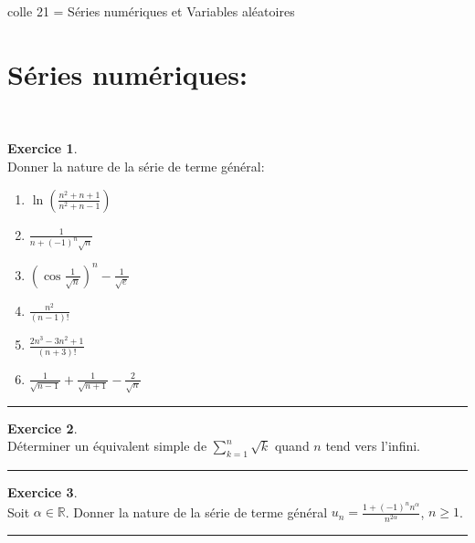 \documentclass[a4paper,10pt]{article}
\theoremstyle{definition}
\theoremstyle{definition}
\newtheorem{exo}{Exercice}
\newcommand{\R}{\mathbb{R}}
\begin{document}
 	
	
	\begin{center}
		\Large \sc colle 21 = Séries numériques et Variables aléatoires
	\end{center}


\section*{Séries numériques:}\hfill\\%
\begin{minipage}{1\linewidth}
	\begin{minipage}[t]{0.48\linewidth}
		\raggedright
		
		
		\begin{exo}\quad\\[0.2cm]
			Donner la nature de la série de terme général:
			\begin{multicols}{2}
				\begin{enumerate}
					\item $\ln\left(\frac{n^2+n+1}{n^2+n-1}\right)$
					\item $\frac{1}{n+(-1)^n\sqrt{n}}$
					\item $\left(\cos\frac{1}{\sqrt{n}}\right)^n-\frac{1}{\sqrt{e}}$
					\item $\frac{n^2}{(n-1)!}$
					\item $\frac{2n^3-3n^2+1}{(n+3)!}$
					\item $\frac{1}{\sqrt{n-1}}+\frac{1}{\sqrt{n+1}}-\frac{2}{\sqrt{n}}$
				\end{enumerate}
			\end{multicols}
			 
			
			\centering
			\rule{1\linewidth}{0.6pt}
		\end{exo}
	
				\begin{exo}\quad\\[0.2cm]
		Déterminer un équivalent simple de $\sum_{k=1}^{n}\sqrt{k}$ quand $n$ tend vers l'infini.
		
		\centering
		\rule{1\linewidth}{0.6pt}
	\end{exo}

	\begin{exo}\quad\\[0.2cm]
	Soit $\alpha\in\R$. Donner la nature de la série de terme général $u_n=\frac{1+(-1)^nn^\alpha}{n^{2\alpha}}$, $n\geqslant1$. 
	
	\centering
	\rule{1\linewidth}{0.6pt}
\end{exo}	
	

\end{minipage}
\end{minipage}
\end{document}
